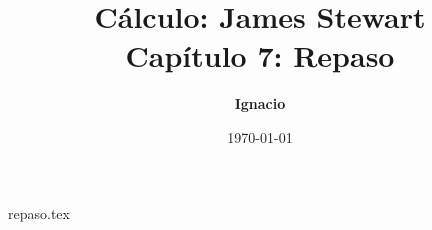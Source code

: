 \documentclass[11pt,spanish,oneside]{report}
\title{\textbf{Cálculo: James Stewart} \\ \Large Capítulo 7: Repaso}
\author{\textbf{Ignacio}}
\date{\today}
\begin{document}
\maketitle

{repaso.tex}
\end{document}
